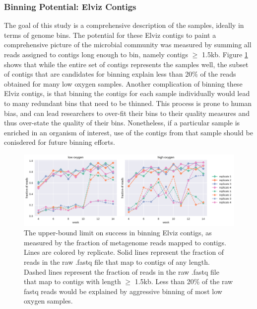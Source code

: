 \subsubsection{Binning Potential: Elviz Contigs}

The goal of this study is a comprehensive description of the samples, ideally in terms of genome bins.
The potential for these Elviz contigs to paint a comprehensive picture of the microbial community was measured by summing all reads assigned to contigs long enough to bin, namely contigs $\geq$ 1.5kb.
Figure \ref{fig:dont_bin_Elviz} shows that while the entire set of contigs represents the samples well, the subset of contigs that are candidates for binning explain less than 20\% of the reads obtained for many low oxygen samples.
Another complication of binning these Elviz contigs, is that binning the contigs for each sample individually would lead to many redundant bins that need to be thinned.
This process is prone to human bias, and can lead researchers to over-fit their bins to their quality measures and thus over-state the quality of their bins.
Nonetheless, if a particular sample is enriched in an organism of interest, use of the contigs from that sample should be conisdered for future binning efforts.


\begin{figure}[H]
\centering
    \includegraphics[width=1.0\textwidth]{./tex/chapter2/figures/170314_Elviz_is_not_for_binning--landscape.pdf}  %
    \begin{singlespace}
    \caption[Upper-bound limit on success of binning Elviz contigs]{
        The upper-bound limit on success in binning Elviz contigs, as measured by the fraction of metagenome reads mapped to contigs.
        Lines are colored by replicate.
        Solid lines represent the fraction of reads in the raw .fastq file that map to contigs of any length.
        Dashed lines represent the fraction of reads in the raw .fastq file that map to contigs with length $\geq$ 1.5kb.
        Less than 20\% of the raw fastq reads would be explained by aggressive binning of most low oxygen samples.}
    \label{fig:dont_bin_Elviz}
    \end{singlespace}
\end{figure}

